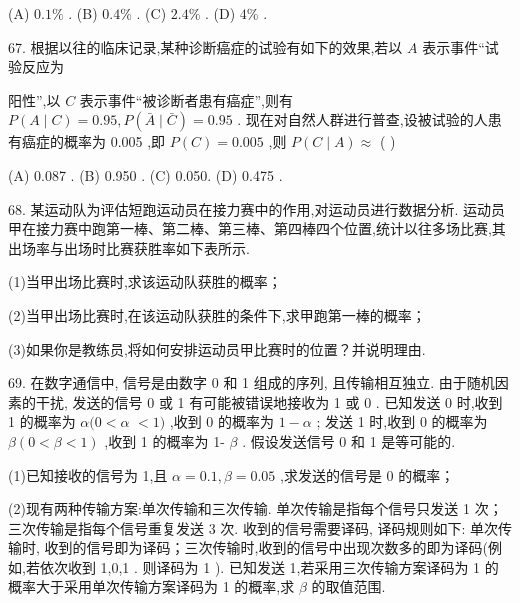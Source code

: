 (A) ${0.1}\%$ . (B) ${0.4}\%$ . (C) ${2.4}\%$ . (D) $4\%$ .

67. 根据以往的临床记录,某种诊断癌症的试验有如下的效果,若以 $A$ 表示事件“试验反应为

阳性”,以 $C$ 表示事件“被诊断者患有癌症”,则有 $P\left( {A \mid  C}\right)  = {0.95},P\left( {\bar{A} \mid  \bar{C}}\right)  = {0.95}$ . 现在对自然人群进行普查,设被试验的人患有癌症的概率为 0.005 ,即 $P\left( C\right)  = {0.005}$ ,则 $P\left( {C \mid  A}\right)  \approx$ (   )

(A) 0.087 . (B) 0.950 . (C) 0.050. (D) 0.475 .

68. 某运动队为评估短跑运动员在接力赛中的作用,对运动员进行数据分析. 运动员甲在接力赛中跑第一棒、第二棒、第三棒、第四棒四个位置,统计以往多场比赛,其出场率与出场时比赛获胜率如下表所示.

\begin{center}
\end{center}

(1)当甲出场比赛时,求该运动队获胜的概率；

(2)当甲出场比赛时,在该运动队获胜的条件下,求甲跑第一棒的概率；

(3)如果你是教练员,将如何安排运动员甲比赛时的位置？并说明理由.

69. 在数字通信中, 信号是由数字 0 和 1 组成的序列, 且传输相互独立. 由于随机因素的干扰, 发送的信号 0 或 1 有可能被错误地接收为 1 或 0 . 已知发送 0 时,收到 1 的概率为 $\alpha (0 < \alpha$  $< 1)$ ,收到 0 的概率为 $1 - \alpha$ ; 发送 1 时,收到 0 的概率为 $\beta \left( {0 < \beta  < 1}\right)$ ,收到 1 的概率为 1- $\beta$ . 假设发送信号 0 和 1 是等可能的.

(1)已知接收的信号为 1,且 $\alpha  = {0.1},\beta  = {0.05}$ ,求发送的信号是 0 的概率；

(2)现有两种传输方案:单次传输和三次传输. 单次传输是指每个信号只发送 1 次；三次传输是指每个信号重复发送 3 次. 收到的信号需要译码, 译码规则如下: 单次传输时, 收到的信号即为译码；三次传输时,收到的信号中出现次数多的即为译码(例如,若依次收到 1,0,1 . 则译码为 1 ). 已知发送 1,若采用三次传输方案译码为 1 的概率大于采用单次传输方案译码为 1 的概率,求 $\beta$ 的取值范围.

